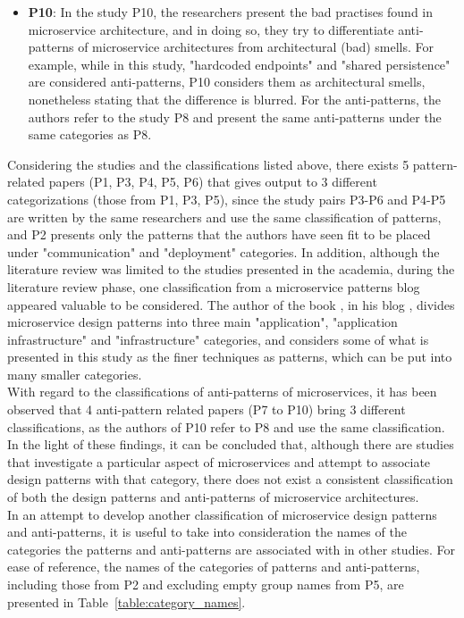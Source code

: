\documentclass{Configuration_Files/PoliMi3i_thesis}
\begin{document}
\begin{itemize}
    \item \textbf{P10}: In the study P10, the researchers present the bad practises found in microservice architecture, and in doing so, they try to differentiate anti-patterns of microservice architectures from architectural (bad) smells.
    For example, while in this study, "hardcoded endpoints" and "shared persistence" are considered anti-patterns, P10 considers them as architectural smells, nonetheless stating that the difference is blurred.
    For the anti-patterns, the authors refer to the study P8 and present the same anti-patterns under the same categories as P8.
\end{itemize}

Considering the studies and the classifications listed above, there exists 5 pattern-related papers (P1, P3, P4, P5, P6) that gives output to 3 different categorizations (those from P1, P3, P5), since the study pairs P3-P6 and P4-P5 are written by the same researchers and use the same classification of patterns, and P2 presents only the patterns that the authors have seen fit to be placed under "communication" and "deployment" categories.
In addition, although the literature review was limited to the studies presented in the academia, during the literature review phase, one classification from a microservice patterns blog appeared valuable to be considered.
The author of the book \cite{richardson_book}, in his blog \cite{blogtaxonomy}, divides microservice design patterns into three main "application", "application infrastructure" and "infrastructure" categories, and considers some of what is presented in this study as the finer techniques as patterns, which can be put into many smaller categories.
\\
With regard to the classifications of anti-patterns of microservices, it has been observed that 4 anti-pattern related papers (P7 to P10) bring 3 different classifications, as the authors of P10 refer to P8 and use the same classification.
\\
In the light of these findings, it can be concluded that, although there are studies that investigate a particular aspect of microservices and attempt to associate design patterns with that category, there does not exist a consistent classification of both the design patterns and anti-patterns of microservice architectures.
\\
In an attempt to develop another classification of microservice design patterns and anti-patterns, it is useful to take into consideration the names of the categories the patterns and anti-patterns are associated with in other studies.
For ease of reference, the names of the categories of patterns and anti-patterns, including those from P2 and excluding empty group names from P5, are presented in Table~\ref{table:category_names}. 
\end{document}
